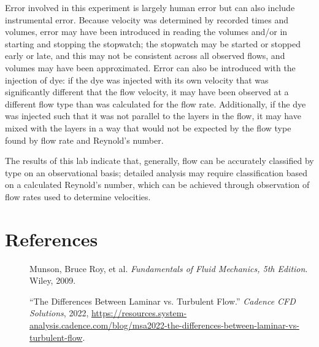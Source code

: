 \documentclass{article}
\begin{document}
\par Error involved in this experiment is largely human error but can also include instrumental error. Because velocity was determined by recorded times and volumes, error may have been introduced in reading the volumes and/or in starting and stopping the stopwatch; the stopwatch may be started or stopped early or late, and this may not be consistent across all observed flows, and volumes may have been approximated. Error can also be introduced with the injection of dye: if the dye was injected with its own velocity that was significantly different that the flow velocity, it may have been observed at a different flow type than was calculated for the flow rate. Additionally, if the dye was injected such that it was not parallel to the layers in the flow, it may have mixed with the layers in a way that would not be expected by the flow type found by flow rate and Reynold's number. 
\par The results of this lab indicate that, generally, flow can be accurately classified by type on an observational basis; detailed analysis may require classification based on a calculated Reynold’s number, which can be achieved through observation of flow rates used to determine velocities. 

\newpage
\section{References}
\begin{description}
    \item[] Munson, Bruce Roy, et al. \emph{Fundamentals of Fluid Mechanics, 5th Edition}. Wiley, 2009.  
    \item[] ``The Differences Between Laminar vs. Turbulent Flow.'' \emph{Cadence CFD Solutions}, 2022, \url{https://resources.system-analysis.cadence.com/blog/msa2022-the-differences-between-laminar-vs-turbulent-flow}.
\end{description}
\newpage
\end{document}
